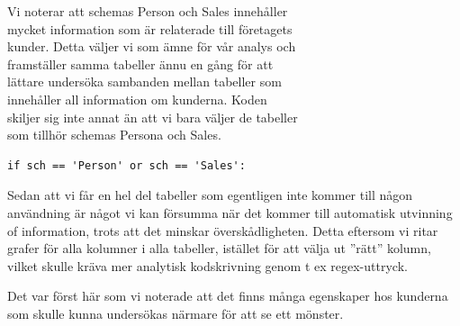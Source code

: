 \documentclass[]{article}
\begin{document}
Vi noterar att schemas Person och Sales innehåller \\
mycket information som är relaterade till företagets  \\
kunder. Detta väljer vi som ämne för vår analys och  \\
framställer samma tabeller ännu en gång för att  \\
lättare undersöka sambanden mellan tabeller som \\ 
innehåller all information om kunderna. Koden  \\
skiljer sig inte annat än att vi bara väljer de tabeller \\ 
som tillhör schemas Persona och Sales.
\begin{lstlisting}
if sch == 'Person' or sch == 'Sales':
\end{lstlisting}
Sedan att vi får en hel del tabeller som egentligen inte kommer till någon användning är något vi kan försumma när det kommer till automatisk utvinning of information, trots att det minskar överskådligheten. Detta eftersom vi ritar grafer för alla kolumner i alla tabeller, istället för att välja ut ''rätt'' kolumn, vilket skulle kräva mer analytisk kodskrivning genom t ex regex-uttryck.
Det var först här som vi noterade att det finns många egenskaper hos kunderna som skulle kunna undersökas närmare för att se ett mönster.
\end{document}
